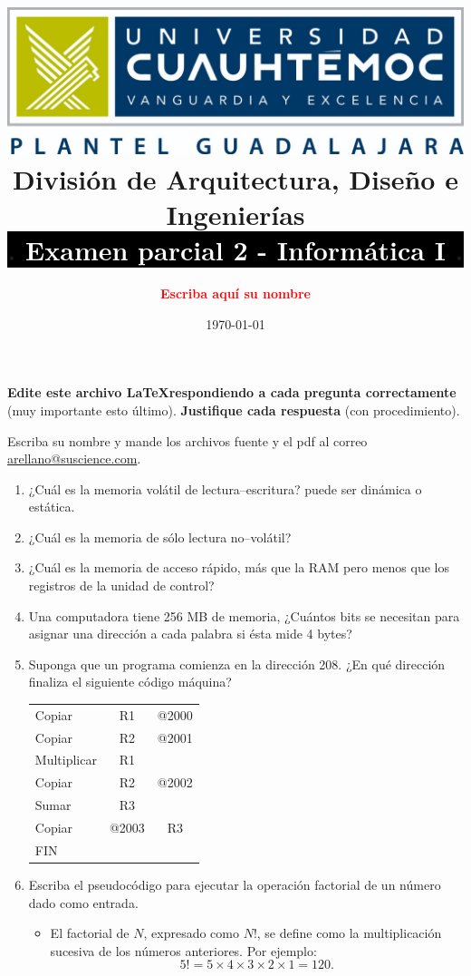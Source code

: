 \documentclass[letterpaper]{article}
\title{\includegraphics[scale=0.2]{Logo.jpg}\\
División de Arquitectura, Diseño e Ingenierías\\
\colorbox{black}{. \hspace{2.45cm} \textcolor{white}{\textbf{Examen parcial 2 - Informática I}} \hspace{2.45cm} .}}
\author{\textcolor{red}{\textbf{Escriba aquí su nombre}}}
\date{\today}
\begin{document}
\maketitle

\textbf{Edite este archivo \LaTeX respondiendo a cada pregunta correctamente} (muy importante esto último). \textbf{Justifique cada respuesta} (con procedimiento).

Escriba su nombre y mande los archivos fuente y el pdf al correo \href{mailto:arellano@suscience.com}{arellano@suscience.com}.

\begin{enumerate}
    \item ¿Cuál es la memoria volátil de lectura--escritura? puede ser dinámica o estática.
    
    
    
    
    \item ¿Cuál es la memoria de sólo lectura no--volátil?
    
    
    
    
    \item ¿Cuál es la memoria de acceso rápido, más que la RAM pero menos que los registros de la unidad de control?
    
    
    
    
    \item Una computadora tiene 256 MB de memoria, ¿Cuántos bits se necesitan para asignar una dirección a cada palabra si ésta mide 4 bytes?
    
    
    
    
    \item Suponga que un programa comienza en la dirección 208. ¿En qué dirección finaliza el siguiente código máquina?
    
    \begin{tabular}{|lcc|}
    \hline
        Copiar  & R1 & @2000\\
        Copiar & R2 & @2001\\
        Multiplicar & R1 & \\
        Copiar & R2 & @2002\\
        Sumar & R3 & \\
        Copiar & @2003 & R3\\
        FIN&&\\
    \hline
    \end{tabular}
    
    
    
    
    \item Escriba el pseudocódigo para ejecutar la operación factorial de un número dado como entrada.
    \begin{itemize}
        \item El factorial de $N$, expresado como $N!$, se define como la multiplicación sucesiva de los números anteriores. Por ejemplo:
        $$5!=5\times4\times3\times2\times1=120.$$
    \end{itemize}
    

\end{enumerate}
\end{document}

